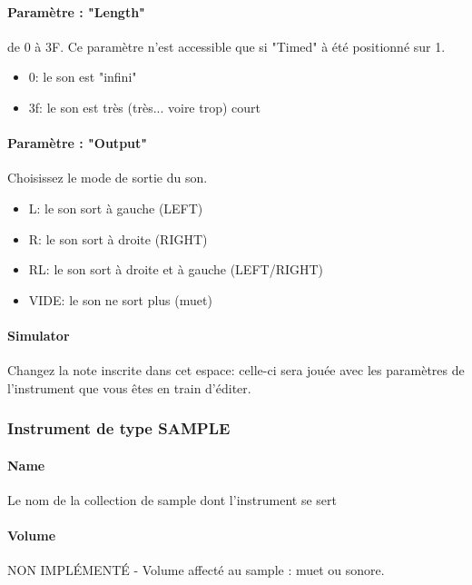 \documentclass[12pt,a4paper]{article}
\begin{document}
        \paragraph{Paramètre : "Length"} de 0 à 3F. Ce paramètre n'est accessible que si "Timed" à été positionné sur 1.
            \begin{itemize}
                \item{0: le son est "infini"}
                \item{3f: le son est très (très... voire trop) court}
            \end{itemize}
        
        \paragraph{Paramètre : "Output"} Choisissez le mode de sortie du son.
            \begin{itemize}
                \item{L: le son sort à gauche (LEFT)}
                \item{R: le son sort à droite (RIGHT)}
                \item{RL: le son sort à droite et à gauche (LEFT/RIGHT)}
                \item{VIDE: le son ne sort plus (muet)}
            \end{itemize}
        
        \paragraph{Simulator} Changez la note inscrite dans cet espace: celle-ci sera jouée avec les paramètres de l'instrument que vous êtes en train d'éditer.
        
        \subsubsection{Instrument de type SAMPLE}
        
        
        \paragraph{Name} Le nom de la collection de sample dont l'instrument se sert

        \paragraph{Volume} NON IMPLÉMENTÉ - Volume affecté au sample : muet ou sonore.
\end{document}
